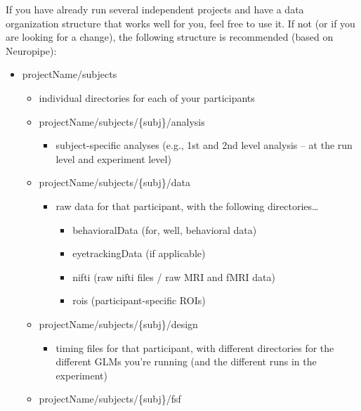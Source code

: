\documentclass[]{book}
\providecommand{\tightlist}{%
  \setlength{\itemsep}{0pt}\setlength{\parskip}{0pt}}
\begin{document}
If you have already run several independent projects and have a data
organization structure that works well for you, feel free to use it. If
not (or if you are looking for a change), the following structure is
recommended (based on Neuropipe):

\begin{itemize}
\tightlist
\item
  projectName/subjects

  \begin{itemize}
  \tightlist
  \item
    individual directories for each of your participants
  \item
    projectName/subjects/\{subj\}/analysis

    \begin{itemize}
    \tightlist
    \item
      subject-specific analyses (e.g., 1st and 2nd level analysis -- at
      the run level and experiment level)
    \end{itemize}
  \item
    projectName/subjects/\{subj\}/data

    \begin{itemize}
    \tightlist
    \item
      raw data for that participant, with the following
      directories\ldots{}

      \begin{itemize}
      \tightlist
      \item
        behavioralData (for, well, behavioral data)
      \item
        eyetrackingData (if applicable)
      \item
        nifti (raw nifti files / raw MRI and fMRI data)
      \item
        rois (participant-specific ROIs)
      \end{itemize}
    \end{itemize}
  \item
    projectName/subjects/\{subj\}/design

    \begin{itemize}
    \tightlist
    \item
      timing files for that participant, with different directories for
      the different GLMs you're running (and the different runs in the
      experiment)
    \end{itemize}
  \item
    projectName/subjects/\{subj\}/fsf


\end{itemize}
\end{itemize}
\end{document}
